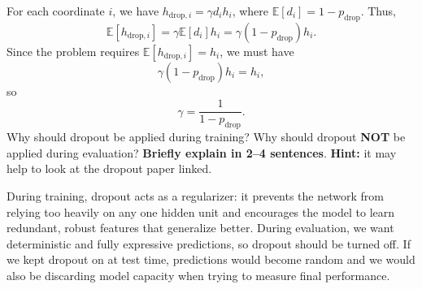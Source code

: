 \begin{parts}
\begin{subparts}
                {\Large \color{red}
                For each coordinate $i$, we have $h_{\text{drop},i} = \gamma d_i h_i$, where
                $\mathbb{E}[d_i] = 1-p_{\text{drop}}$. Thus,
                \[
                \mathbb{E}[h_{\text{drop},i}] = \gamma\mathbb{E}[d_i]h_i
                = \gamma(1-p_{\text{drop}})h_i.
                \]
                Since the problem requires $\mathbb{E}[h_{\text{drop},i}] = h_i$, we must have
                \[
                \gamma(1-p_{\text{drop}})h_i = h_i,
                \]
                so
                \[
                \boxed{\gamma = \frac{1}{1-p_{\text{drop}}}.}
                \]
                }
          \subpart[2] Why should dropout be applied during training? Why should dropout \textbf{NOT} be applied during evaluation? \textbf{Briefly explain in 2--4 sentences}. \textbf{Hint:} it may help to look at the dropout paper linked. \newline
                
                {\Large \color{red}
                During training, dropout acts as a regularizer: it prevents the network from relying too heavily on any one hidden unit and encourages the model to learn redundant, robust features that generalize better. During evaluation, we want deterministic and fully expressive predictions, so dropout should be turned off. If we kept dropout on at test time, predictions would become random and we would also be discarding model capacity when trying to measure final performance.
                }
         
        \end{subparts}


\end{parts}
